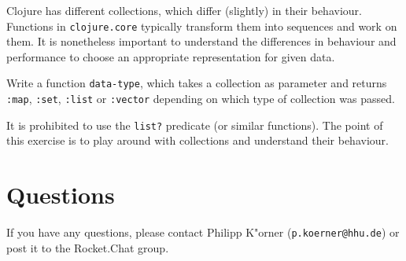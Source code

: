 \documentclass[11pt,a4paper]{article}
\begin{document}
\begin{exercise}
	Clojure has different collections, which differ (slightly) in their behaviour.
	Functions in \verb|clojure.core| typically transform them into sequences and work on them.
	It is nonetheless important to understand the differences in behaviour and performance 
	to choose an appropriate representation for given data.

    Write a function \verb|data-type|, which takes a collection as parameter and returns \verb|:map|, \verb|:set|, \verb|:list| or \verb|:vector|
    depending on which type of collection was passed.

    It is prohibited to use the \verb|list?| predicate (or similar functions).
	The point of this exercise is to play around with collections and understand their behaviour.
\end{exercise}

	\section*{Questions}
	If you have any questions, please contact Philipp K"orner (\texttt{p.koerner@hhu.de}) or post it to the Rocket.Chat group.
\end{document}
